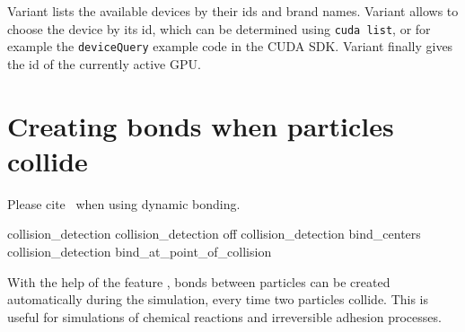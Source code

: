 Variant  lists the available devices by their ids and brand
names. Variant  allows to choose the device by its id,
which can be determined using \texttt{cuda list}, or for example the
\texttt{deviceQuery} example code in the CUDA SDK. Variant 
finally gives the id of the currently active GPU.


\section{Creating bonds when particles collide}

\begin{citebox}
  Please cite~ when using dynamic bonding.
\end{citebox}


\begin{essyntax}
 collision_detection
 collision_detection off
 collision_detection  bind_centers  
 collision_detection  bind_at_point_of_collision    
\end{essyntax}

With the help of the feature , bonds
between particles can be created automatically during the simulation,
every time two particles collide. This is useful for simulations of
chemical reactions and irreversible adhesion processes.

